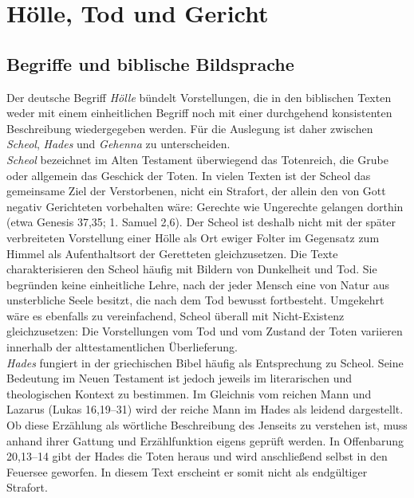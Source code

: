 \chapter{Hölle, Tod und Gericht}

\section{Begriffe und biblische Bildsprache}

Der deutsche Begriff \emph{Hölle} bündelt Vorstellungen, die in den biblischen Texten weder mit einem einheitlichen Begriff noch mit einer durchgehend konsistenten Beschreibung wiedergegeben werden. Für die Auslegung ist daher zwischen \emph{Scheol}, \emph{Hades} und \emph{Gehenna} zu unterscheiden.
\\

\emph{Scheol} bezeichnet im Alten Testament überwiegend das Totenreich, die Grube oder allgemein das Geschick der Toten. In vielen Texten ist der Scheol das gemeinsame Ziel der Verstorbenen, nicht ein Strafort, der allein den von Gott negativ Gerichteten vorbehalten wäre: Gerechte wie Ungerechte gelangen dorthin (etwa Genesis 37,35; 1. Samuel 2,6). Der Scheol ist deshalb nicht mit der später verbreiteten Vorstellung einer Hölle als Ort ewiger Folter im Gegensatz zum Himmel als Aufenthaltsort der Geretteten gleichzusetzen. Die Texte charakterisieren den Scheol häufig mit Bildern von Dunkelheit und Tod. Sie begründen keine einheitliche Lehre, nach der jeder Mensch eine von Natur aus unsterbliche Seele besitzt, die nach dem Tod bewusst fortbesteht. Umgekehrt wäre es ebenfalls zu vereinfachend, Scheol überall mit Nicht-Existenz gleichzusetzen: Die Vorstellungen vom Tod und vom Zustand der Toten variieren innerhalb der alttestamentlichen Überlieferung.
\\

\emph{Hades} fungiert in der griechischen Bibel häufig als Entsprechung zu Scheol. Seine Bedeutung im Neuen Testament ist jedoch jeweils im literarischen und theologischen Kontext zu bestimmen. Im Gleichnis vom reichen Mann und Lazarus (Lukas 16,19--31) wird der reiche Mann im Hades als leidend dargestellt. Ob diese Erzählung als wörtliche Beschreibung des Jenseits zu verstehen ist, muss anhand ihrer Gattung und Erzählfunktion eigens geprüft werden. In Offenbarung 20,13--14 gibt der Hades die Toten heraus und wird anschließend selbst in den Feuersee geworfen. In diesem Text erscheint er somit nicht als endgültiger Strafort.
\\

